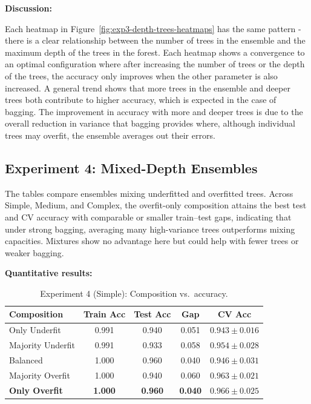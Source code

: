 \documentclass[conference]{IEEEtran}
\begin{document}
\textbf{Discussion:}

  Each heatmap in Figure~\ref{fig:exp3-depth-trees-heatmaps} has the same pattern - there is a clear relationship between the number of trees in the ensemble 
  and the maximum depth of the trees in the forest. Each heatmap shows a convergence to an optimal configuration where after increasing the number of trees or the depth of 
  the trees, the accuracy only improves when the other parameter is also increased. A general trend shows that more trees in the ensemble and deeper trees both 
  contribute to higher accuracy, which is expected in the case of bagging. The improvement in accuracy with more and deeper trees is due to the overall reduction 
  in variance that bagging provides where, although individual trees may overfit, the ensemble averages out their errors.  



\subsection{Experiment 4: Mixed-Depth Ensembles}
\label{sec:results-exp4}
The tables compare ensembles mixing underfitted and overfitted trees. Across Simple, Medium, and Complex, the overfit-only composition attains the best test and CV accuracy with comparable or smaller train--test gaps, indicating that under strong bagging, averaging many high-variance trees outperforms mixing capacities. Mixtures show no advantage here but could help with fewer trees or weaker bagging.

\textbf{Quantitative results:}

\begin{table}[h]
\centering
\caption{Experiment 4 (Simple): Composition vs.\ accuracy.}
\label{tab:exp4-simple}
\begin{tabular}{lcccc}
\toprule
Composition & Train Acc & Test Acc & Gap & CV Acc \\
\midrule
Only Underfit      & 0.991 & 0.940 & 0.051 & $0.943 \pm 0.016$ \\
Majority Underfit  & 0.991 & 0.933 & 0.058 & $0.954 \pm 0.028$ \\
Balanced           & 1.000 & 0.960 & 0.040 & $0.946 \pm 0.031$ \\
Majority Overfit   & 1.000 & 0.940 & 0.060 & $0.963 \pm 0.021$ \\
\textbf{Only Overfit}      & \textbf{1.000} & \textbf{0.960} & \textbf{0.040} & $\mathbf{0.966 \pm 0.025}$ \\
\bottomrule
\end{tabular}
\end{table}
\end{document}
